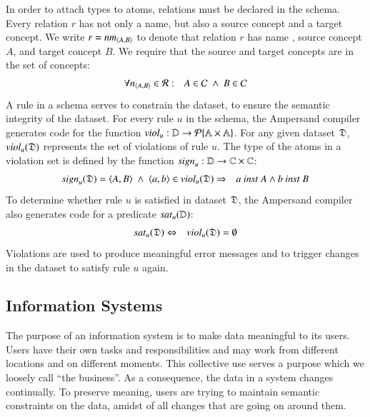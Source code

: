 \documentclass{elsarticle}
\begin{document}
   In order to attach types to atoms, relations must be declared in the schema.
   Every relation $r$ has not only a name, but also a source concept and a target concept.
   We write $r=\text{\it nm\/}_{\langle{A},{B}\rangle}$ to denote that relation $r$ has name , source concept $A$, and target concept $B$.
   We require that the source and target concepts are in the set of concepts:
\begin{eqnarray}
   \forall\declare{n}{A}{B}\in\rels&:&A\in\concepts\ \wedge\ B\in\concepts
   \label{eqn:relationsIntroduceConcepts}
\end{eqnarray}
   A rule in a schema serves to constrain the dataset,
   to ensure the semantic integrity of the dataset.
   For every rule $u$ in the schema, the Ampersand compiler generates code
   for the function $\text{\it viol\/}_u : \mathbb{D}\rightarrow\cal{P}\{\mathbb{A}\times\mathbb{A}\}$.
   For any given dataset $\mathfrak{D}$, $\text{\it viol\/}_{u}(\mathfrak{D})$ represents the set of violations of rule $u$.
   The type of the atoms in a violation set is defined by the function $\text{\it sign\/}_{u} : \mathbb{D}\rightarrow\mathbb{C}\times\mathbb{C}$:
\begin{eqnarray}
   \sign{u}{\dataset}=\pair{A}{B}\ \wedge\ \pair{a}{b}\in\viol{u}{\dataset}&\Rightarrow&a\ \inst\ A\wedge b\ \inst\ B
   \label{eqn:typed violations}
\end{eqnarray}
To determine whether rule $u$ is satisfied in dataset $\mathfrak{D}$,
the Ampersand compiler also generates code for a predicate $\text{\it sat\/}_{u}(\mathbb{D})$:
\begin{eqnarray}
   \text{\it sat\/}_{u}(\mathfrak{D})&\Leftrightarrow&\text{\it viol\/}_{u}(\mathfrak{D})=\emptyset
   \label{eqn:sat}
\end{eqnarray}
   Violations are used to produce meaningful error messages and to trigger changes in the dataset to satisfy rule $u$ again.

\subsection{Information Systems}
\label{sct:Information Systems}
   The purpose of an information system is to make data meaningful to its users.
   Users have their own tasks and responsibilities
   and may work from different locations and on different moments.
   This collective use serves a purpose which we loosely call ``the business''.
   As a consequence, the data in a system changes continually.
   To preserve meaning, users are trying to maintain semantic constraints on the data,
   amidst of all changes that are going on around them.
\end{document}
